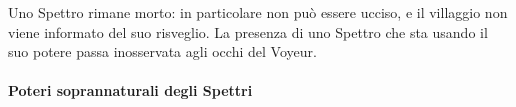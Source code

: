 \documentclass[a4paper,10pt]{article}
\begin{document}
\begin{itemize}
 Uno Spettro rimane morto: in particolare non può essere ucciso, e il villaggio non viene informato del suo risveglio.
 La presenza di uno Spettro che sta usando il suo potere passa inosservata agli occhi del Voyeur.
 
 
\end{itemize}


\paragraph{Poteri soprannaturali degli Spettri}
\end{document}
